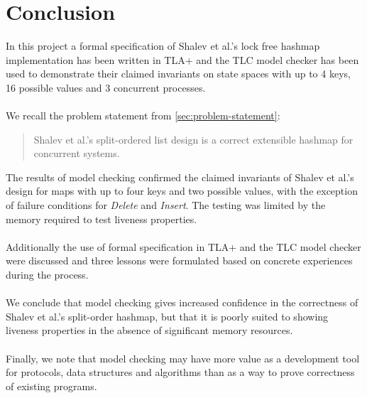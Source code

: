 \documentclass{uit-thesis}
\begin{document}
\section{Conclusion}
In this project a formal specification of Shalev et al.'s lock free hashmap implementation has been written in TLA+ and the TLC model checker has been used to demonstrate their claimed invariants on state spaces with up to 4 keys, 16 possible values and 3 concurrent processes.
\\\\
We recall the problem statement from \autoref{sec:problem-statement}:
\begin{quotation}
    Shalev et al.'s split-ordered list design is a correct extensible hashmap for concurrent systems.
\end{quotation}
The results of model checking confirmed the claimed invariants of Shalev et al.'s design for maps with up to four keys and two possible values, with the exception of failure conditions for \textit{Delete} and \textit{Insert}. The testing was limited by the memory required to test liveness properties.
\\\\
Additionally the use of formal specification in TLA+ and the TLC model checker were discussed and three lessons were formulated based on concrete experiences during the process.
\\\\
We conclude that model checking gives increased confidence in the correctness of Shalev et al.'s split-order hashmap, but that it is poorly suited to showing liveness properties in the absence of significant memory resources.
\\\\
Finally, we note that model checking may have more value as a development tool for protocols, data structures and algorithms than as a way to prove correctness of existing programs.
\backmatter
{}
{}
\printbibliography{}
\end{document}
